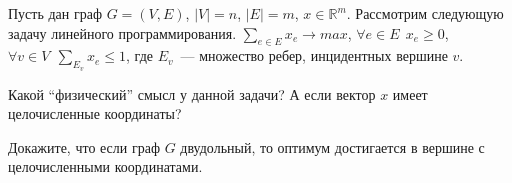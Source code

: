 Пусть дан граф $G = (V, E)$, $|V| = n$, $|E| = m$, $x \in \mathbb{R}^m$. Рассмотрим следующую задачу
линейного программирования. $\sum\limits_{e \in E} x_e \rightarrow max$, $\forall e \in E ~~ x_e \ge 0$,
$\forall v \in V ~~ \sum\limits_{E_v} x_e \le 1$, где $E_v$~--- множество ребер, инцидентных вершине $v$.
\begin{enumcyr}
	\item Какой ``физический'' смысл у данной задачи? А если вектор $x$ имеет целочисленные координаты?
    \item Докажите, что если граф $G$ двудольный, то оптимум достигается в вершине с целочисленными
	    координатами.
\end{enumcyr}